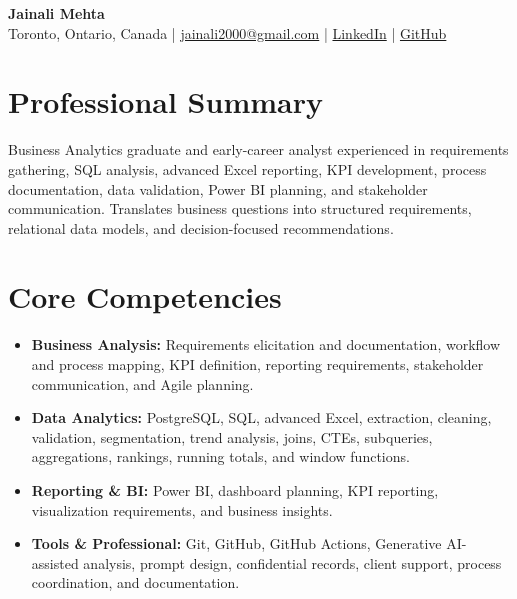 \documentclass[letterpaper,10pt]{article}
\begin{document}
\begin{center}
  {\fontsize{17}{19}\selectfont\textbf{Jainali Mehta}}\\[2pt]
  \small Toronto, Ontario, Canada \;|\;
  \href{mailto:jainali2000@gmail.com}{jainali2000@gmail.com} \;|\;
  \href{https://www.linkedin.com/in/jainali-mehta}{LinkedIn} \;|\;
  \href{https://github.com/jainalimehta}{GitHub}
\end{center}
\vspace{-7pt}

\section{Professional Summary}
\small Business Analytics graduate and early-career analyst experienced in requirements gathering, SQL analysis, advanced Excel reporting, KPI development, process documentation, data validation, Power BI planning, and stakeholder communication. Translates business questions into structured requirements, relational data models, and decision-focused recommendations.

\section{Core Competencies}
\begin{itemize}[leftmargin=0.17in,label=\textbullet,topsep=0pt,itemsep=1pt,parsep=0pt]
  \item \small \textbf{Business Analysis:} Requirements elicitation and documentation, workflow and process mapping, KPI definition, reporting requirements, stakeholder communication, and Agile planning.
  \item \small \textbf{Data Analytics:} PostgreSQL, SQL, advanced Excel, extraction, cleaning, validation, segmentation, trend analysis, joins, CTEs, subqueries, aggregations, rankings, running totals, and window functions.
  \item \small \textbf{Reporting \& BI:} Power BI, dashboard planning, KPI reporting, visualization requirements, and business insights.
  \item \small \textbf{Tools \& Professional:} Git, GitHub, GitHub Actions, Generative AI-assisted analysis, prompt design, confidential records, client support, process coordination, and documentation.
\end{itemize}
\end{document}
